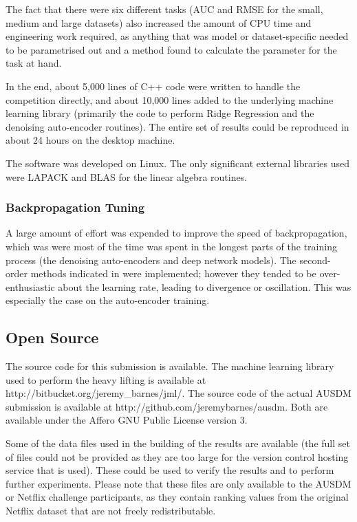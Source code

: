 \documentclass{article}
\begin{document}
The fact that there were six different tasks (AUC and RMSE for the small, medium and large datasets) also increased the amount of CPU time and engineering work required, as anything that was model or dataset-specific needed to be parametrised out and a method found to calculate the parameter for the task at hand.

In the end, about 5,000 lines of C++ code were written to handle the competition directly, and about 10,000 lines added to the underlying machine learning library (primarily the code to perform Ridge Regression and the denoising auto-encoder routines).  The entire set of results could be reproduced in about 24 hours on the desktop machine.

The software was developed on Linux.  The only significant external libraries used were LAPACK and BLAS for the linear algebra routines.

\subsubsection{Backpropagation Tuning}

A large amount of effort was expended to improve the speed of backpropagation, which was were most of the time was spent in the longest parts of the training process (the denoising auto-encoders and deep network models).  The second-order methods indicated in \cite{lecun-98b} were implemented; however they tended to be over-enthusiastic about the learning rate, leading to divergence or oscillation.  This was especially the case on the auto-encoder training.

\subsection{Open Source}

The source code for this submission is available.  The machine learning library used to perform the heavy lifting is available at http://bitbucket.org/jeremy\_barnes/jml/.  The source code of the actual AUSDM submission is available at http://github.com/jeremybarnes/ausdm.  Both are available under the Affero GNU Public License version 3.

Some of the data files used in the building of the results are available (the full set of files could not be provided as they are too large for the version control hosting service that is used).  These could be used to verify the results and to perform further experiments.  Please note that these files are only available to the AUSDM or Netflix challenge participants, as they contain ranking values from the original Netflix dataset that are not freely redistributable.
\end{document}
